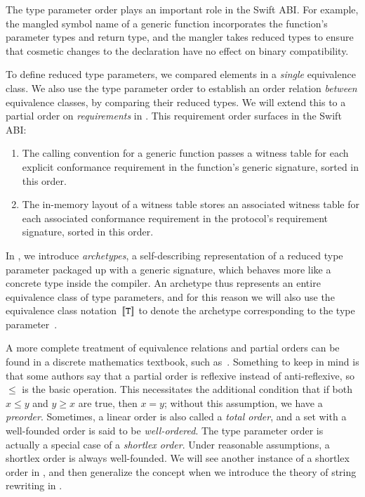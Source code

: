 \documentclass[../generics]{subfiles}
\begin{document}
The type parameter order plays an important role in the Swift ABI. For example, the mangled symbol name of a generic function incorporates the function's parameter types and return type, and the mangler takes reduced types to ensure that cosmetic changes to the declaration have no effect on binary compatibility.

To define reduced type parameters, we compared elements in a \emph{single} equivalence class. We also use the type parameter order to establish an order relation \emph{between} equivalence classes, by comparing their reduced types. We will extend this to a partial order on \emph{requirements} in . This requirement order surfaces in the Swift ABI:
\begin{enumerate}
\item The calling convention for a generic function passes a witness table for each explicit conformance requirement in the function's generic signature, sorted in this order.
\item The in-memory layout of a witness table stores an associated witness table for each associated conformance requirement in the protocol's requirement signature, sorted in this order.
\end{enumerate}

In , we introduce \emph{archetypes}, a self-describing representation of a reduced type parameter packaged up with a generic signature, which behaves more like a concrete type inside the compiler. An archetype thus represents an entire equivalence class of type parameters, and for this reason we will also use the equivalence class notation~$[\![\texttt{T}]\!]$ to denote the archetype corresponding to the type parameter~\tT.

A more complete treatment of equivalence relations and partial orders can be found in a discrete mathematics textbook, such as~\cite{grimaldi}. Something to keep in mind is that some authors say that a partial order is reflexive instead of anti-reflexive, so $\leq$ is the basic operation. This necessitates the additional condition that if both $x\leq y$ and $y\geq x$ are true, then $x=y$; without this assumption, we have a \emph{preorder}. Sometimes, a linear order is also called a \emph{total order}, and a set with a well-founded order is said to be \emph{well-ordered}. The type parameter order is actually a special case of a \emph{shortlex order}. Under reasonable assumptions, a shortlex order is always well-founded. We will see another instance of a shortlex order in , and then generalize the concept when we introduce the theory of string rewriting in .
\end{document}
